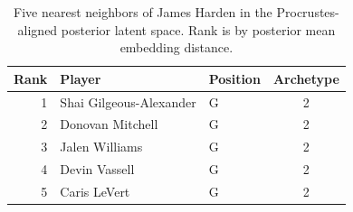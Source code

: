 \begin{table}[htbp]
  \centering\small
  \begin{tabular}{rllc}
    \toprule
    Rank & Player & Position & Archetype \\
    \midrule
    1 & Shai Gilgeous-Alexander & G & 2 \\
    2 & Donovan Mitchell & G & 2 \\
    3 & Jalen Williams & G & 2 \\
    4 & Devin Vassell & G & 2 \\
    5 & Caris LeVert & G & 2 \\
    \bottomrule
  \end{tabular}
  \caption{Five nearest neighbors of James Harden in the Procrustes-aligned posterior latent space. Rank is by posterior mean embedding distance.}
  \label{tab:James_Harden_neighbors}
\end{table}

